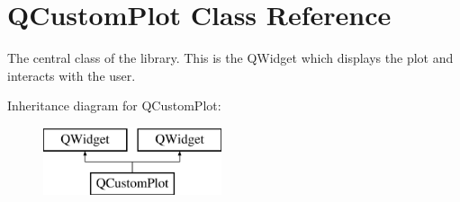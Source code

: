 \hypertarget{class_q_custom_plot}{}\section{Q\+Custom\+Plot Class Reference}
\label{class_q_custom_plot}


The central class of the library. This is the Q\+Widget which displays the plot and interacts with the user.  


Inheritance diagram for Q\+Custom\+Plot\+:\begin{figure}[H]
\begin{center}
\leavevmode
\includegraphics[height=2.000000cm]{class_q_custom_plot}
\end{center}
\end{figure}
